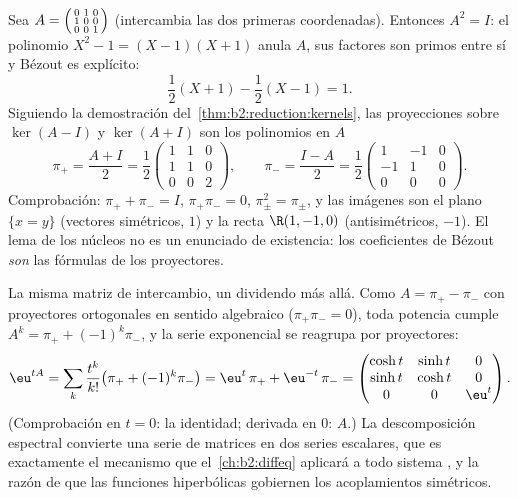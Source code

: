 \begin{example}\label{ex:b2:reduction:projectorswork}
Sea $A = \begin{psmallmatrix}0 & 1 & 0\\ 1 & 0 & 0\\ 0 & 0 &
1\end{psmallmatrix}$ (intercambia las dos primeras coordenadas).
Entonces $A^2 = I$: el polinomio $X^2 - 1 = (X - 1)(X + 1)$ anula
$A$, sus factores son primos entre sí y Bézout es explícito:
\[
\frac{1}{2}(X + 1) - \frac12(X - 1) = 1 .
\]
Siguiendo la demostración del~\cref{thm:b2:reduction:kernels}, las
proyecciones sobre $\ker(A - I)$ y $\ker(A + I)$ son los polinomios
en $A$
\[
\pi_+ = \frac{A + I}{2} = \frac12\begin{pmatrix}
1 & 1 & 0\\ 1 & 1 & 0\\ 0 & 0 & 2\end{pmatrix},
\qquad
\pi_- = \frac{I - A}{2} = \frac12\begin{pmatrix}
1 & -1 & 0\\ -1 & 1 & 0\\ 0 & 0 & 0\end{pmatrix}.
\]
Comprobación: $\pi_+ + \pi_- = I$, $\pi_+\pi_- = 0$, $\pi_\pm^2 =
\pi_\pm$, y las imágenes son el plano $\{x = y\}$ (vectores
simétricos,  $1$) y la recta $\R(1, -1, 0)$
(antisimétricos,  $-1$). El lema de los núcleos no es
un enunciado de existencia: los coeficientes de Bézout \emph{son}
las fórmulas de los proyectores.
\end{example}

\begin{example}\label{ex:b2:reduction:expprojectors}
La misma matriz de intercambio, un dividendo más allá. Como $A =
\pi_+ - \pi_-$ con proyectores ortogonales en sentido algebraico
($\pi_+\pi_- = 0$), toda potencia cumple $A^k = \pi_+ +
(-1)^k\pi_-$, y la serie exponencial se reagrupa por proyectores:
\[
\eu^{tA} = \sum_k \frac{t^k}{k!}\bigl(\pi_+ +
(-1)^k\pi_-\bigr)
= \eu^{t}\,\pi_+ + \eu^{-t}\,\pi_- =
\begin{pmatrix}
\cosh t & \sinh t & 0\\
\sinh t & \cosh t & 0\\
0 & 0 & \eu^{t}
\end{pmatrix}.
\]
(Comprobación en $t = 0$: la identidad; derivada en $0$: $A$.) La
descomposición espectral convierte una serie de matrices en dos
series escalares, que es exactamente el mecanismo que el~\cref{ch:b2:diffeq} aplicará a todo sistema , y la
razón de que las funciones hiperbólicas gobiernen los acoplamientos
simétricos.
\end{example}

